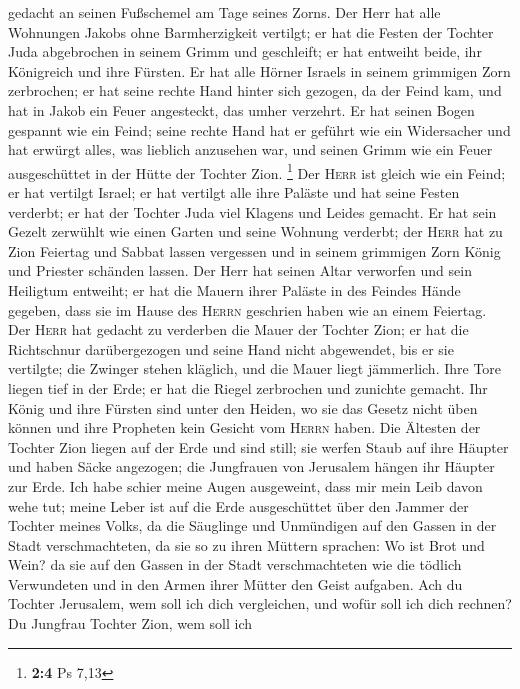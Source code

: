 gedacht an seinen Fußschemel am Tage seines Zorns.  Der
Herr hat alle Wohnungen Jakobs ohne Barmherzigkeit vertilgt; er hat die
Festen der Tochter Juda abgebrochen in seinem Grimm und geschleift; er
hat entweiht beide, ihr Königreich und ihre Fürsten.  Er
hat alle Hörner Israels in seinem grimmigen Zorn zerbrochen; er hat
seine rechte Hand hinter sich gezogen, da der Feind kam, und hat in
Jakob ein Feuer angesteckt, das umher verzehrt.  Er hat
seinen Bogen gespannt wie ein Feind; seine rechte Hand hat er geführt
wie ein Widersacher und hat erwürgt alles, was lieblich anzusehen war,
und seinen Grimm wie ein Feuer ausgeschüttet in der Hütte der Tochter
Zion. \footnote{\textbf{2:4} Ps 7,13}  Der \textsc{Herr}
ist gleich wie ein Feind; er hat vertilgt Israel; er hat vertilgt alle
ihre Paläste und hat seine Festen verderbt; er hat der Tochter Juda viel
Klagens und Leides gemacht.  Er hat sein Gezelt zerwühlt
wie einen Garten und seine Wohnung verderbt; der \textsc{Herr} hat zu
Zion Feiertag und Sabbat lassen vergessen und in seinem grimmigen Zorn
König und Priester schänden lassen.  Der Herr hat seinen
Altar verworfen und sein Heiligtum entweiht; er hat die Mauern ihrer
Paläste in des Feindes Hände gegeben, dass sie im Hause des
\textsc{Herrn} geschrien haben wie an einem Feiertag.  Der
\textsc{Herr} hat gedacht zu verderben die Mauer der Tochter Zion; er
hat die Richtschnur darübergezogen und seine Hand nicht abgewendet, bis
er sie vertilgte; die Zwinger stehen kläglich, und die Mauer liegt
jämmerlich.  Ihre Tore liegen tief in der Erde; er hat die
Riegel zerbrochen und zunichte gemacht. Ihr König und ihre Fürsten sind
unter den Heiden, wo sie das Gesetz nicht üben können und ihre Propheten
kein Gesicht vom \textsc{Herrn} haben.  Die Ältesten der
Tochter Zion liegen auf der Erde und sind still; sie werfen Staub auf
ihre Häupter und haben Säcke angezogen; die Jungfrauen von Jerusalem
hängen ihr Häupter zur Erde.  Ich habe schier meine Augen
ausgeweint, dass mir mein Leib davon wehe tut; meine Leber ist auf die
Erde ausgeschüttet über den Jammer der Tochter meines Volks, da die
Säuglinge und Unmündigen auf den Gassen in der Stadt verschmachteten,
 da sie so zu ihren Müttern sprachen: Wo ist Brot und
Wein? da sie auf den Gassen in der Stadt verschmachteten wie die tödlich
Verwundeten und in den Armen ihrer Mütter den Geist aufgaben.
 Ach du Tochter Jerusalem, wem soll ich dich vergleichen,
und wofür soll ich dich rechnen? Du Jungfrau Tochter Zion, wem soll ich
